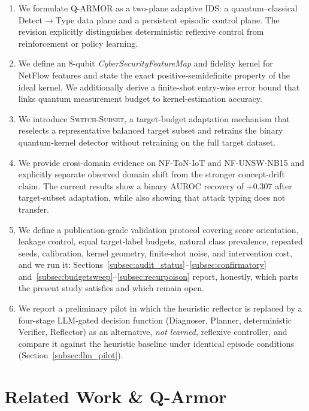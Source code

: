 \documentclass[conference]{IEEEtran}
\begin{document}
\begin{enumerate}
\item We formulate Q-ARMOR as a two-plane adaptive IDS: a
quantum--classical Detect$\to$Type data plane and a persistent episodic
control plane. The revision explicitly distinguishes deterministic
reflexive control from reinforcement or policy learning.
\item We define an 8-qubit \textit{CyberSecurityFeatureMap} and fidelity
kernel for NetFlow features and state the exact positive-semidefinite
property of the ideal kernel. We additionally derive a finite-shot
entry-wise error bound that links quantum measurement budget to
kernel-estimation accuracy.
\item We introduce \textsc{Switch-Subset}, a target-budget adaptation
mechanism that reselects a representative balanced target subset and
retrains the binary quantum-kernel detector without retraining on the
full target dataset.
\item We provide cross-domain evidence on NF-ToN-IoT and NF-UNSW-NB15 and
explicitly separate observed domain shift from the stronger concept-drift
claim. The current results show a binary AUROC recovery of $+0.307$ after
target-subset adaptation, while also showing that attack typing does not
transfer.
\item We define a publication-grade validation protocol covering score
orientation, leakage control, equal target-label budgets, natural class
prevalence, repeated seeds, calibration, kernel geometry, finite-shot
noise, and intervention cost, and we run it: Sections~\ref{subsec:audit_status}--\ref{subsec:confirmatory}
and~\ref{subsec:budgetsweep}--\ref{subsec:recurpoison} report, honestly,
which parts the present study satisfies and which remain open.
\item We report a preliminary pilot in which the heuristic reflector is
replaced by a four-stage LLM-gated decision function (Diagnoser, Planner,
deterministic Verifier, Reflector) as an alternative, \emph{not learned},
reflexive controller, and compare it against the heuristic baseline under
identical episode conditions (Section~\ref{subsec:llm_pilot}).
\end{enumerate}

\section{Related Work \& Q-Armor}
\label{sec:related}
\end{document}
